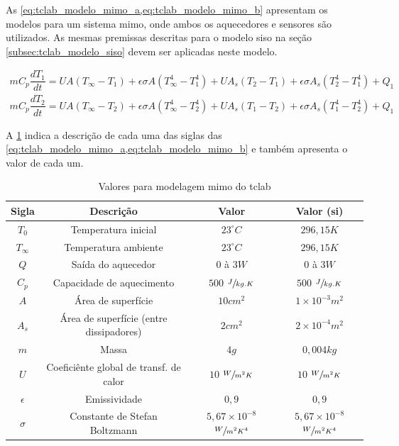 As \cref{eq:tclab_modelo_mimo_a,eq:tclab_modelo_mimo_b} apresentam os modelos
para um sistema \acrshort{mimo}, onde ambos os aquecedores e sensores são utilizados.
As mesmas premissas descritas para o modelo \acrshort{siso} na seção \ref{subsec:tclab_modelo_siso}
devem ser aplicadas neste modelo.

\begin{subequations}
	\label{eq:tclab_modelo_mimo}
	\begin{gather}
		mC_p \dfrac{dT_1}{dt} = UA (T_{\infty} - T_1) + \epsilon \sigma A (T_{\infty}^{4} - T_{1}^{4}) + UA_s (T_2 - T_1) + \epsilon \sigma A_s (T_{2}^{4} - T_{1}^{4}) + Q_1		\label{eq:tclab_modelo_mimo_a} \\
		mC_p \dfrac{dT_2}{dt} = UA (T_{\infty} - T_2) + \epsilon \sigma A (T_{\infty}^{4} - T_{2}^{4}) + UA_s (T_1 - T_2) + \epsilon \sigma A_s (T_{1}^{4} - T_{2}^{4}) + Q_1		\label{eq:tclab_modelo_mimo_b}
	\end{gather}
\end{subequations}

A \cref{tab:tclab_modelo_mimo_valores} indica a descrição de cada uma das siglas das
\cref{eq:tclab_modelo_mimo_a,eq:tclab_modelo_mimo_b} e também apresenta o valor de cada um.

\begin{table}[h]
	\caption{Valores para modelagem \acrshort{mimo} do \acrshort{tclab}}
	\label{tab:tclab_modelo_mimo_valores}
	\centering
		\begin{tabular}{cccc} \toprule
			{Sigla} 		& {Descrição} 								& {Valor} 											& {Valor (\acrshort{si})} 							\\ \midrule
			$T_{0}$ 		& Temperatura inicial 						& $23^\circ C$ 										& $296{,}15 K $										\\
			$T_{\infty}$	& Temperatura ambiente						& $23^\circ C$										& $296{,}15 K $										\\
			$Q$				& Saída do aquecedor						& $0$ à $3 W$										& $0$ à $3 W$										\\
			$C_p$			& Capacidade de aquecimento					& $500$ $\sfrac{J}{kg.K}$							& $500$ $\sfrac{J}{kg.K}$							\\
			$A$				& Área de superfície						& $10 cm^{2}$										& $1 \times 10^{-3} m^{2}$							\\
			$A_s$			& Área de superfície (entre dissipadores)	& $2 cm^{2}$										& $2 \times 10^{-4} m^{2}$							\\
			$m$				& Massa										& $4 g$												& $0{,}004 kg	$									\\
			$U$				& Coeficiênte global de transf. de calor	& $10$ $\sfrac{W}{m^{2}K}$							& $10$ $\sfrac{W}{m^{2}K}$							\\
			$\epsilon$		& Emissividade								& $0{,}9$											& $0{,}9$											\\
			$\sigma$		& Constante de Stefan Boltzmann				& $5{,}67 \times 10^{-8}$ $\sfrac{W}{m^{2}K^{4}}$	& $5{,}67 \times 10^{-8}$ $\sfrac{W}{m^{2}K^{4}}$	\\ \bottomrule
		\end{tabular}
\end{table}